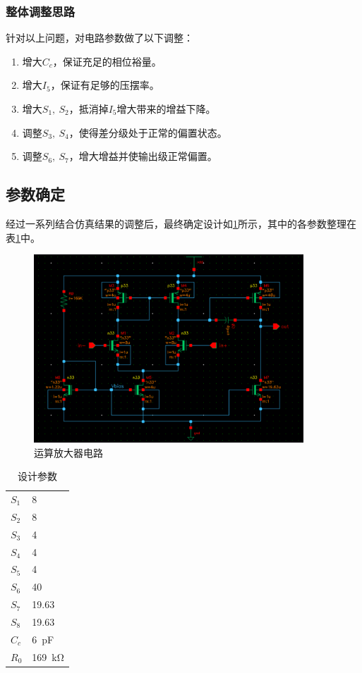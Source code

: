 \documentclass[UTF8]{ctexart}
\numberwithin{figure}{subsection}
\numberwithin{table}{subsection}
\numberwithin{equation}{subsection}
\begin{document}
\subsubsection{整体调整思路}
针对以上问题，对电路参数做了以下调整：
\begin{enumerate}
    \item 增大\(C_c\)，保证充足的相位裕量。
    \item 增大\(I_5\)，保证有足够的压摆率。
    \item 增大\(S_1,\ S_2\)，抵消掉\(I_5\)增大带来的增益下降。
    \item 调整\(S_3,\ S_4\)，使得差分级处于正常的偏置状态。
    \item 调整\(S_6,\ S_7\)，增大增益并使输出级正常偏置。
\end{enumerate}


\subsection{参数确定}
经过一系列结合仿真结果的调整后，最终确定设计如\ref{design circuit}所示，其中的各参数整理在表\ref{design parameters}中。

\begin{figure}[!ht]
    \begin{center}
        \includegraphics[width=0.9\textwidth]{design circuit.png}
    \end{center}
    \caption{运算放大器电路}
    \label{design circuit}
\end{figure}

\begin{table}[!ht]
    \centering 
    \begin{tabular}{l l}
    \toprule
        $S_1$ & 8\\ 
        $S_2$ & 8\\ 
        $S_3$ & 4\\ 
        $S_4$ & 4\\ 
        $S_5$ & 4\\ 
        $S_6$ & 40\\ 
        $S_7$ & 19.63\\
        $S_8$ & 19.63\\
        $C_c$ & \SI[]{6}{\pico\farad}\\
        $R_0$ & \SI[]{169}{\kilo\ohm}\\
    \bottomrule
    \end{tabular}
    \caption{设计参数}
    \label{design parameters}
\end{table}
\end{document}
